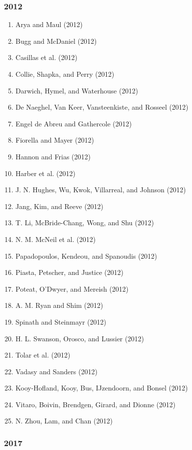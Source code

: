 \documentclass[english,man]{apa6}
\providecommand{\tightlist}{%
  \setlength{\itemsep}{0pt}\setlength{\parskip}{0pt}}
\theoremstyle{definition}
\theoremstyle{definition}
\theoremstyle{definition}
\theoremstyle{remark}
\begin{document}
\subsubsection{2012}\label{section-18}

\begin{enumerate}
\def\labelenumi{\arabic{enumi})}
\tightlist
\item
  Arya and Maul (2012)
\item
  Bugg and McDaniel (2012)
\item
  Casillas et al. (2012)
\item
  Collie, Shapka, and Perry (2012)
\item
  Darwich, Hymel, and Waterhouse (2012)
\item
  De Naeghel, Van Keer, Vansteenkiste, and Rosseel (2012)
\item
  Engel de Abreu and Gathercole (2012)
\item
  Fiorella and Mayer (2012)
\item
  Hannon and Frias (2012)
\item
  Harber et al. (2012)
\item
  J. N. Hughes, Wu, Kwok, Villarreal, and Johnson (2012)
\item
  Jang, Kim, and Reeve (2012)
\item
  T. Li, McBride-Chang, Wong, and Shu (2012)
\item
  N. M. McNeil et al. (2012)
\item
  Papadopoulos, Kendeou, and Spanoudis (2012)
\item
  Piasta, Petscher, and Justice (2012)
\item
  Poteat, O'Dwyer, and Mereish (2012)
\item
  A. M. Ryan and Shim (2012)
\item
  Spinath and Steinmayr (2012)
\item
  H. L. Swanson, Orosco, and Lussier (2012)
\item
  Tolar et al. (2012)
\item
  Vadasy and Sanders (2012)
\item
  Kooy-Hofland, Kooy, Bus, IJzendoorn, and Bonsel (2012)
\item
  Vitaro, Boivin, Brendgen, Girard, and Dionne (2012)
\item
  N. Zhou, Lam, and Chan (2012)
\end{enumerate}

\subsubsection{2017}\label{section-19}
\end{document}
